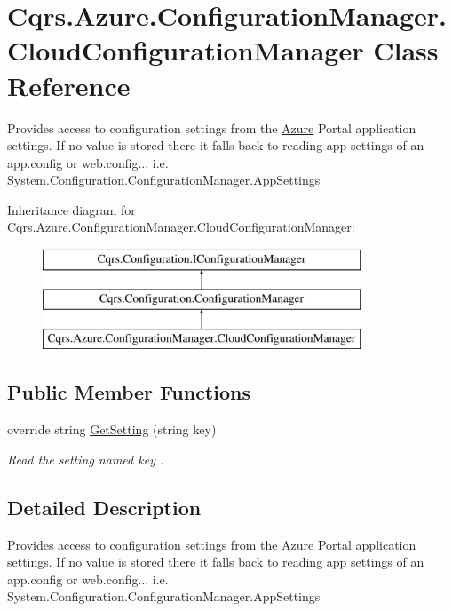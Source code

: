 \hypertarget{classCqrs_1_1Azure_1_1ConfigurationManager_1_1CloudConfigurationManager}{}\section{Cqrs.\+Azure.\+Configuration\+Manager.\+Cloud\+Configuration\+Manager Class Reference}
\label{classCqrs_1_1Azure_1_1ConfigurationManager_1_1CloudConfigurationManager}


Provides access to configuration settings from the \hyperlink{namespaceCqrs_1_1Azure}{Azure} Portal application settings. If no value is stored there it falls back to reading app settings of an app.\+config or web.\+config... i.\+e. System.\+Configuration.\+Configuration\+Manager.\+App\+Settings  


Inheritance diagram for Cqrs.\+Azure.\+Configuration\+Manager.\+Cloud\+Configuration\+Manager\+:\begin{figure}[H]
\begin{center}
\leavevmode
\includegraphics[height=3.000000cm]{classCqrs_1_1Azure_1_1ConfigurationManager_1_1CloudConfigurationManager}
\end{center}
\end{figure}
\subsection*{Public Member Functions}
\begin{DoxyCompactItemize}
\item 
override string \hyperlink{classCqrs_1_1Azure_1_1ConfigurationManager_1_1CloudConfigurationManager_a48228b7e2204a2449426de32cd6ecc65_a48228b7e2204a2449426de32cd6ecc65}{Get\+Setting} (string key)
\begin{DoxyCompactList}\small\item\em Read the setting named {\itshape key} . \end{DoxyCompactList}\end{DoxyCompactItemize}


\subsection{Detailed Description}
Provides access to configuration settings from the \hyperlink{namespaceCqrs_1_1Azure}{Azure} Portal application settings. If no value is stored there it falls back to reading app settings of an app.\+config or web.\+config... i.\+e. System.\+Configuration.\+Configuration\+Manager.\+App\+Settings 



